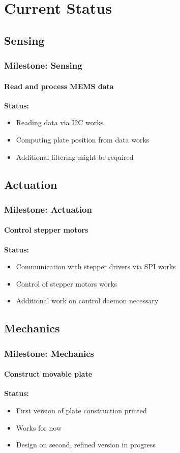 \documentclass{beamer}
\begin{document}
\section{Current Status}
\subsection{Sensing}
\begin{frame}
  \frametitle{Milestone: Sensing}
  \framesubtitle{Read and process MEMS data}
  \textbf{Status:}
	\begin{itemize}
		\item Reading data via I2C works
		\item Computing plate position from data works
		\item Additional filtering might be required
	\end{itemize}
\end{frame}

\subsection{Actuation}
\begin{frame}
  \frametitle{Milestone: Actuation}
  \framesubtitle{Control stepper motors}
  \textbf{Status:}
	\begin{itemize}
		\item Communication with stepper drivers via SPI works
		\item Control of stepper motors works
		\item Additional work on control daemon necessary
	\end{itemize}
\end{frame}

\subsection{Mechanics}
\begin{frame}
  \frametitle{Milestone: Mechanics}
  \framesubtitle{Construct movable plate}
  \textbf{Status:}
	\begin{itemize}
		\item First version of plate construction printed
		\item Works for now
		\item Design on second, refined version in progress
	\end{itemize}
\end{frame}
\end{document}
